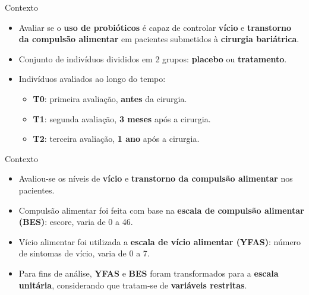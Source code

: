 \documentclass[
  ignorenonframetext,
  serif,
  professionalfont,
  usenames,
  dvipsnames,
  aspectratio = 169]{beamer}
\begin{document}
\begin{frame}{Contexto}
\protect\hypertarget{contexto}{}
\begin{itemize}
  \itemsep 2ex
  
  \item Avaliar se o \textbf{uso de probióticos} é capaz de controlar \textbf{vício} e \textbf{transtorno da compulsão alimentar} em pacientes submetidos à \textbf{cirurgia bariátrica}.

  \item Conjunto de indivíduos divididos em 2 grupos: \textbf{placebo} ou \textbf{tratamento}.

  \item Indivíduos avaliados ao longo do tempo:
  \begin{itemize}
    \item \textbf{T0}: primeira avaliação, \textbf{antes} da cirurgia.
    \item \textbf{T1}: segunda avaliação, \textbf{3 meses} após a cirurgia.
    \item \textbf{T2}: terceira avaliação, \textbf{1 ano} após a cirurgia.
  \end{itemize}
\end{itemize}
\end{frame}

\begin{frame}{Contexto}
\protect\hypertarget{contexto-1}{}
\begin{itemize}
  \itemsep 2ex
  
  \item Avaliou-se os níveis de \textbf{vício} e \textbf{transtorno da compulsão alimentar} nos pacientes.

  \item Compulsão alimentar foi feita com base na \textbf{escala de compulsão alimentar (BES)}: escore, varia de 0 a 46.

  \item Vício alimentar foi utilizada a \textbf{escala de vício alimentar (YFAS)}: número de sintomas de vício, varia de 0 a 7.

  \item Para fins de análise, \textbf{YFAS} e \textbf{BES} foram transformados para a \textbf{escala unitária}, considerando que tratam-se de \textbf{variáveis restritas}.

\end{itemize}
\end{frame}
\end{document}
